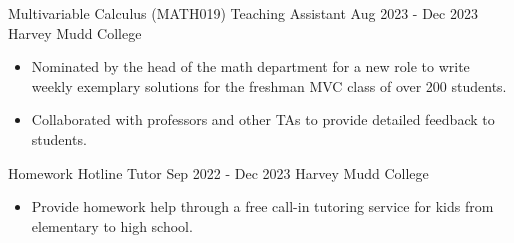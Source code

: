 \documentclass[9pt]{resume}
\begin{document}
\begin{experiencelist}
        \experience 
            {Multivariable Calculus (MATH019) Teaching Assistant}
            {Aug 2023 - Dec 2023}
            {Harvey Mudd College}
            {\begin{itemize}[noitemsep, topsep=1pt] 
                \item Nominated by the head of the math department for a new role to write weekly exemplary solutions for the freshman MVC class of over 200 students.
                \item Collaborated with professors and other TAs to provide detailed feedback to students. 
            \end{itemize}}
        \experience
            {Homework Hotline Tutor}
            {Sep 2022 - Dec 2023} 
            {Harvey Mudd College}
            {\begin{itemize}[noitemsep, topsep=1pt]
                \item Provide homework help through a free call-in tutoring service for kids from elementary to high school.
            \end{itemize}}
    \end{experiencelist}
    \vspace{-0.2cm}
\end{document}
